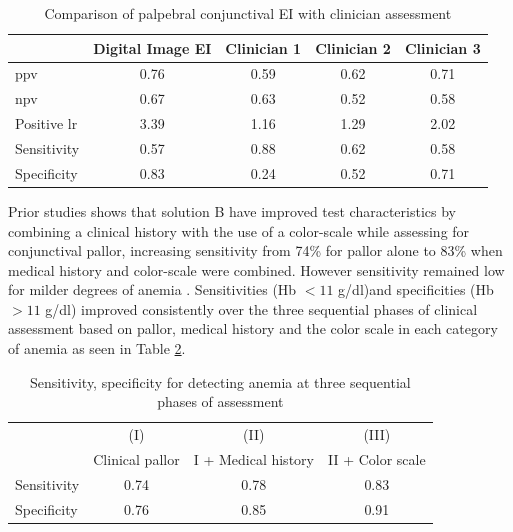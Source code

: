 \documentclass[peerreview]{IEEEtran}
\begin{document}
\begin{table}
\centering
\begin{tabular}{l c c c c}
\toprule 
 & Digital Image EI & Clinician 1 & Clinician 2 & Clinician 3 \\ 
\midrule 
\acrshort{ppv} & 0.76 & 0.59 & 0.62 & 0.71 \\ 
\acrshort{npv} & 0.67 & 0.63 & 0.52 & 0.58 \\ 
Positive \acrshort{lr} & 3.39 & 1.16 & 1.29 & 2.02 \\
Sensitivity & 0.57 & 0.88 & 0.62 & 0.58 \\ 
Specificity & 0.83 & 0.24 & 0.52 & 0.71 \\
\bottomrule
\end{tabular}
\smallskip 
\caption{ Comparison of palpebral conjunctival EI with clinician assessment}
\label{tab:ei}
\end{table}

Prior studies shows that solution B have improved test characteristics by combining a clinical history with the use of a color-scale while 
assessing for conjunctival pallor, increasing sensitivity from 74\% for pallor alone to 83\% when medical history 
and color-scale were combined. However sensitivity remained low for milder degrees of anemia \cite{chowdhury2002taking}.
Sensitivities (Hb $< 11$ g/dl)and specificities (Hb $>11$ g/dl) improved consistently over the three sequential phases of clinical assessment based 
on pallor, medical history and the color scale in each category of anemia as seen in Table \ref{tab:imp_ei}. 

\begin{table}
\centering
\begin{tabular}{l c c c}
\toprule 
 & (I) & (II) & (III) \\
 & Clinical pallor & I + Medical history & II + Color scale \\ 
\midrule 
Sensitivity & 0.74 & 0.78 & 0.83 \\ 
Specificity & 0.76 & 0.85 & 0.91 \\
\bottomrule
\end{tabular}
\smallskip 
\caption{Sensitivity, specificity for detecting anemia at three sequential phases of assessment}
\label{tab:imp_ei}
\end{table}
\end{document}
